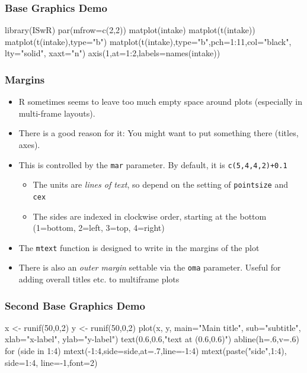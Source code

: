 \documentclass[xcolor=svgnames]{beamer}
\newcommand{\code}[1]{\texttt{#1}}
\let\overbatim\verbatim
\let\endoverbatim\endverbatim
\newenvironment{vcode}%
{\bgroup\baselineskip=0.8\baselineskip\overbatim}%
{\endoverbatim\egroup}
\begin{document}
\begin{frame}[fragile]
  \frametitle{Base Graphics Demo}
\begin{vcode}
library(ISwR)
par(mfrow=c(2,2))
matplot(intake)
matplot(t(intake))
matplot(t(intake),type="b")
matplot(t(intake),type="b",pch=1:11,col="black",
        lty="solid", xaxt="n")
axis(1,at=1:2,labels=names(intake))
\end{vcode}
\end{frame}


\begin{frame}
  \frametitle{Margins}
  \begin{itemize}
  \item R sometimes seems to leave too much empty space around plots
    (especially in multi-frame layouts).
  \item There is a good reason for it: You might want to put something
    there (titles, axes).
  \item This is controlled by the \code{mar} parameter. By default, it is
    \code{c(5,4,4,2)+0.1}
    \begin{itemize}
      \item The units are \emph{lines of text}, so depend on the setting of
      \code{pointsize} and \code{cex}
      \item The sides are indexed in clockwise order, starting at the bottom
      (1=bottom, 2=left, 3=top, 4=right)
      \end{itemize}   
  \item The \code{mtext} function is designed to write in the margins
    of the plot
  \item There is also an \emph{outer margin} settable via the
    \code{oma} parameter. Useful for adding overall titles etc. to
    multiframe plots
  \end{itemize}
\end{frame}

\begin{frame}[fragile]
  \frametitle{Second Base Graphics Demo}
  \begin{vcode}
x <- runif(50,0,2)
y <- runif(50,0,2)
plot(x, y, main="Main title", sub="subtitle",
     xlab="x-label", ylab="y-label")
text(0.6,0.6,"text at (0.6,0.6)")
abline(h=.6,v=.6)
for (side in 1:4) 
   mtext(-1:4,side=side,at=.7,line=-1:4)
mtext(paste("side",1:4), side=1:4, line=-1,font=2)
  \end{vcode}
\end{frame}
\end{document}
